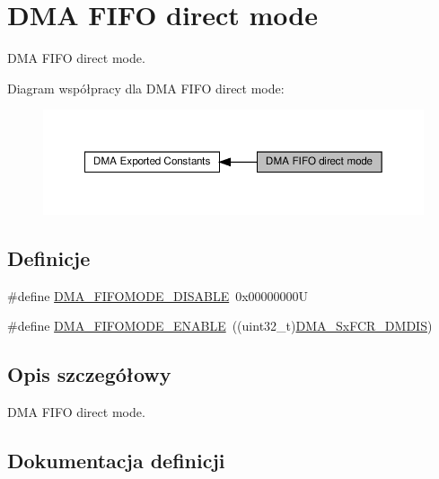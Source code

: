 \hypertarget{group___d_m_a___f_i_f_o__direct__mode}{}\section{D\+MA F\+I\+FO direct mode}
\label{group___d_m_a___f_i_f_o__direct__mode}


D\+MA F\+I\+FO direct mode.  


Diagram współpracy dla D\+MA F\+I\+FO direct mode\+:\nopagebreak
\begin{figure}[H]
\begin{center}
\leavevmode
\includegraphics[width=350pt]{group___d_m_a___f_i_f_o__direct__mode}
\end{center}
\end{figure}
\subsection*{Definicje}
\begin{DoxyCompactItemize}
\item 
\#define \hyperlink{group___d_m_a___f_i_f_o__direct__mode_gaec22b199f9da9214bf908d7edbcd83e8}{D\+M\+A\+\_\+\+F\+I\+F\+O\+M\+O\+D\+E\+\_\+\+D\+I\+S\+A\+B\+LE}~0x00000000U
\item 
\#define \hyperlink{group___d_m_a___f_i_f_o__direct__mode_ga18709570bed6b9112520701c482fbe4b}{D\+M\+A\+\_\+\+F\+I\+F\+O\+M\+O\+D\+E\+\_\+\+E\+N\+A\+B\+LE}~((uint32\+\_\+t)\hyperlink{group___peripheral___registers___bits___definition_ga89406bb954742665691c0ac2f8d95ec9}{D\+M\+A\+\_\+\+Sx\+F\+C\+R\+\_\+\+D\+M\+D\+IS})
\end{DoxyCompactItemize}


\subsection{Opis szczegółowy}
D\+MA F\+I\+FO direct mode. 



\subsection{Dokumentacja definicji}
\mbox{\label{group___d_m_a___f_i_f_o__direct__mode_gaec22b199f9da9214bf908d7edbcd83e8}} 
